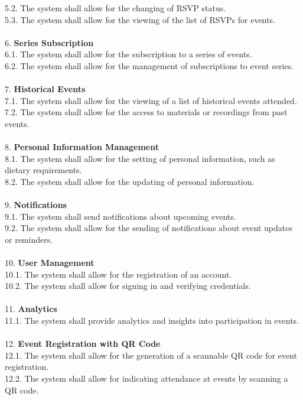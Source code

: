 \documentclass[a4paper,12pt]{article}
\begin{document}
    5.2. The system shall allow for the changing of RSVP status.\\
    5.3. The system shall allow for the viewing of the list of RSVPs for events.\\\\
6. \textbf{Series Subscription}\\
    6.1. The system shall allow for the subscription to a series of events.\\
    6.2. The system shall allow for the management of subscriptions to event series.\\\\
7. \textbf{Historical Events}\\
    7.1. The system shall allow for the viewing of a list of historical events attended.\\
    7.2. The system shall allow for the access to materials or recordings from past events.\\\\
8. \textbf{Personal Information Management}\\
    8.1. The system shall allow for the setting of personal information, such as dietary requirements.\\
    8.2. The system shall allow for the updating of personal information.\\\\
9. \textbf{Notifications}\\
    9.1. The system shall send notifications about upcoming events.\\
    9.2. The system shall allow for the sending of notifications about event updates or reminders.\\\\
10. \textbf{User Management}\\
    10.1. The system shall allow for the registration of an account.\\
    10.2. The system shall allow for signing in and verifying credentials.\\\\
11. \textbf{Analytics}\\
    11.1. The system shall provide analytics and insights into participation in events.\\\\
12. \textbf{Event Registration with QR Code}\\
    12.1. The system shall allow for the generation of a scannable QR code for event registration.\\
    12.2. The system shall allow for indicating attendance at events by scanning a QR code.\\
\end{document}
